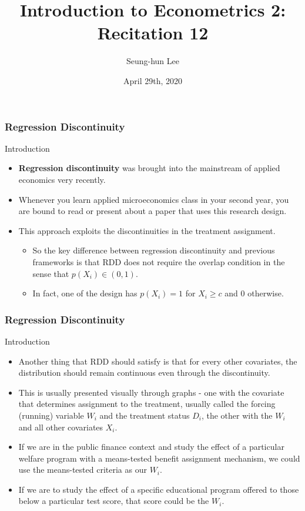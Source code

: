 \documentclass{beamer}
\title[Econometrics 2]{Introduction to Econometrics 2: Recitation 12} %
\author{Seung-hun Lee}
\institute{Columbia University}
\date{April 29th, 2020}
\begin{document}
\begin{frame}
\titlepage
\end{frame}

\begin{frame}
\frametitle{Regression Discontinuity}
Introduction 
\begin{itemize}
\item \textbf{Regression discontinuity} was brought into the mainstream of applied economics very recently.
\item Whenever you learn applied microeconomics class in your second year, you are bound to read or present about a paper that uses this research design.
\item This approach exploits the discontinuities in the treatment assignment. 
\begin{itemize} 
\item So the key difference between regression discontinuity and previous frameworks is that RDD does not require the overlap condition in the sense that $p(X_i)\in(0,1)$. 
\item In fact, one of the design has $p(X_i)=1$ for $X_i\geq c$ and $0$ otherwise.
\end{itemize}
\end{itemize}
\end{frame}

\begin{frame}
\frametitle{Regression Discontinuity}
Introduction 
\begin{itemize}
\item  Another thing that RDD should satisfy is that for every other covariates, the distribution should remain continuous even through the discontinuity.
\item This is usually presented visually through graphs - one with the covariate that determines assignment to the treatment, usually called the forcing (running) variable $W_i$ and the treatment status $D_i$, the other with the $W_i$ and all other covariates $X_i$. 
\item If we are in the public finance context and study the effect of a particular welfare program with a means-tested benefit assignment mechanism, we could use the means-tested criteria as our $W_i$.
\item If we are to study the effect of a specific educational program offered to those below a particular test score, that score could be the $W_i$.
\end{itemize}
\end{frame}
\end{document}
